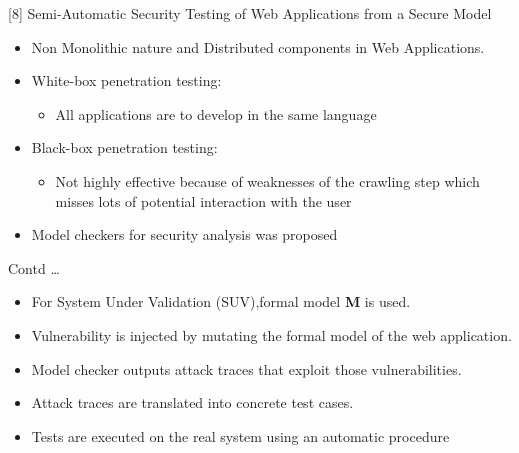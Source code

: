\documentclass[xcolor=x11names,compress]{beamer}
\renewcommand{\(}{\begin{columns}}
\renewcommand{\)}{\end{columns}}
\newcommand{\<}[1]{\begin{column}{#1}}
\renewcommand{\>}{\end{column}}
\begin{document}
\begin{frame}{[8] Semi-Automatic Security Testing of Web
		Applications from a Secure Model}
	\begin{itemize}
		\item Non Monolithic nature and Distributed components in Web Applications.\newline
		\item White-box penetration testing:
		\begin{itemize}
			\item All applications are to develop in the same language
			\newline
		\end{itemize}
		\item Black-box penetration testing:
		\begin{itemize}
			\item Not highly effective because of weaknesses of the crawling step which misses lots
			of potential interaction with the user
		\end{itemize}
		\item Model checkers for security analysis
		was proposed
	\end{itemize}
\end{frame}
\begin{frame}{Contd \dots}
	\begin{itemize}
		\item For System Under Validation
		(SUV),formal model \textbf{M} is used.
		\item Vulnerability is injected by mutating the formal model of the web application.
		\item Model checker outputs attack traces that exploit those vulnerabilities.
		\item Attack traces are translated into concrete test cases.
		\item Tests are executed on the real system using an automatic procedure
	\end{itemize}
\end{frame}
\end{document}
